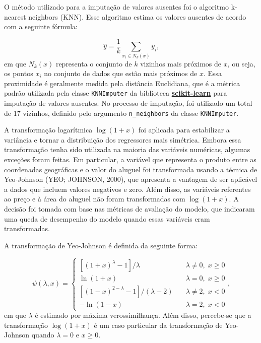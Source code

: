 \documentclass[
  12pt,
  a4paper,
]{scrreprt}
\begin{document}
\vspace{12pt}

O método utilizado para a imputação de valores ausentes foi o algoritmo
k-nearest neighbors (KNN). Esse algoritmo estima os valores ausentes de
acordo com a seguinte fórmula:

\[
\hat{y} = \frac{1}{k}\sum_{x_i \in N_k\left(x\right)}y_i\text{,}
\] em que \(N_k(x)\) representa o conjunto de \(k\) vizinhos mais
próximos de \(x\), ou seja, os pontos \(x_i\) no conjunto de dados que
estão mais próximos de \(x\). Essa proximidade é geralmente medida pela
distância Euclidiana, que é a métrica padrão utilizada pela classe
\texttt{KNNImputer} da biblioteca
\href{https://scikit-learn.org/stable/}{\textbf{scikit-learn}} para
imputação de valores ausentes. No processo de imputação, foi utilizado
um total de 17 vizinhos, definido pelo argumento \texttt{n\_neighbors}
da classe \texttt{KNNImputer}.

\vspace{12pt}

A transformação logarítmica \(\log\left(1 + x\right)\) foi aplicada para
estabilizar a variância e tornar a distribuição dos regressores mais
simétrica. Embora essa transformação tenha sido utilizada na maioria das
variáveis numéricas, algumas exceções foram feitas. Em particular, a
variável que representa o produto entre as coordenadas geográficas e o
valor do aluguel foi transformada usando a técnica de Yeo-Johnson (YEO;
JOHNSON, 2000), que apresenta a vantagem de ser aplicável a dados que
incluem valores negativos e zero. Além disso, as variáveis referentes ao
preço e à área do aluguel não foram transformadas com
\(\log\left(1 + x\right)\). A decisão foi tomada com base nas métricas
de avaliação do modelo, que indicaram uma queda de desempenho do modelo
quando essas variáveis eram transformadas.

\vspace{12pt}

A transformação de Yeo-Johnson é definida da seguinte forma:

\[
\psi(\lambda, x) = \begin{cases}
    [(1 + x)^\lambda - 1] / \lambda  &  \lambda \neq 0, \; x \ge 0 \\
    \ln(1 + x)                       &  \lambda = 0, \; x \ge 0 \\
    [(1 - x)^{2 - \lambda} - 1] / (\lambda - 2) \quad & \lambda \neq 2, \; x < 0 \\
    -\ln(1 - x)                     &   \lambda = 2, \; x < 0
\end{cases} \text{,}
\] em que \(\lambda\) é estimado por máxima verossimilhança. Além disso,
percebe-se que a transformação \(\log(1 + x)\) é um caso particular da
transformação de Yeo-Johnson quando \(\lambda = 0\) e \(x \ge 0\).
\end{document}
